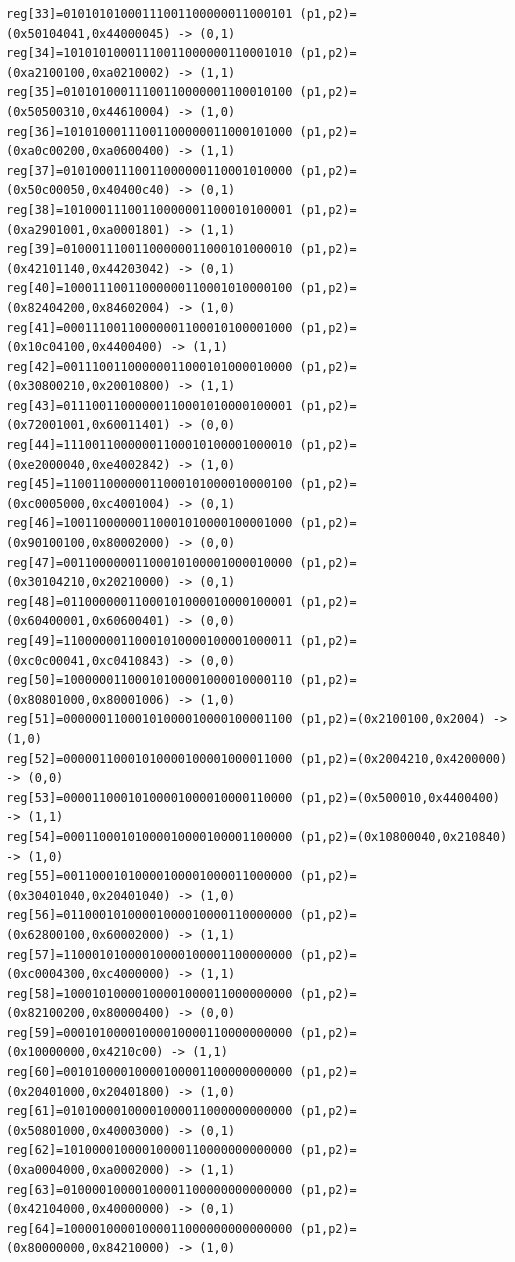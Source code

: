 \begin{lstlisting}
reg[33]=01010101000111001100000011000101 (p1,p2)=(0x50104041,0x44000045) -> (0,1)
reg[34]=10101010001110011000000110001010 (p1,p2)=(0xa2100100,0xa0210002) -> (1,1)
reg[35]=01010100011100110000001100010100 (p1,p2)=(0x50500310,0x44610004) -> (1,0)
reg[36]=10101000111001100000011000101000 (p1,p2)=(0xa0c00200,0xa0600400) -> (1,1)
reg[37]=01010001110011000000110001010000 (p1,p2)=(0x50c00050,0x40400c40) -> (0,1)
reg[38]=10100011100110000001100010100001 (p1,p2)=(0xa2901001,0xa0001801) -> (1,1)
reg[39]=01000111001100000011000101000010 (p1,p2)=(0x42101140,0x44203042) -> (0,1)
reg[40]=10001110011000000110001010000100 (p1,p2)=(0x82404200,0x84602004) -> (1,0)
reg[41]=00011100110000001100010100001000 (p1,p2)=(0x10c04100,0x4400400) -> (1,1)
reg[42]=00111001100000011000101000010000 (p1,p2)=(0x30800210,0x20010800) -> (1,1)
reg[43]=01110011000000110001010000100001 (p1,p2)=(0x72001001,0x60011401) -> (0,0)
reg[44]=11100110000001100010100001000010 (p1,p2)=(0xe2000040,0xe4002842) -> (1,0)
reg[45]=11001100000011000101000010000100 (p1,p2)=(0xc0005000,0xc4001004) -> (0,1)
reg[46]=10011000000110001010000100001000 (p1,p2)=(0x90100100,0x80002000) -> (0,0)
reg[47]=00110000001100010100001000010000 (p1,p2)=(0x30104210,0x20210000) -> (0,1)
reg[48]=01100000011000101000010000100001 (p1,p2)=(0x60400001,0x60600401) -> (0,0)
reg[49]=11000000110001010000100001000011 (p1,p2)=(0xc0c00041,0xc0410843) -> (0,0)
reg[50]=10000001100010100001000010000110 (p1,p2)=(0x80801000,0x80001006) -> (1,0)
reg[51]=00000011000101000010000100001100 (p1,p2)=(0x2100100,0x2004) -> (1,0)
reg[52]=00000110001010000100001000011000 (p1,p2)=(0x2004210,0x4200000) -> (0,0)
reg[53]=00001100010100001000010000110000 (p1,p2)=(0x500010,0x4400400) -> (1,1)
reg[54]=00011000101000010000100001100000 (p1,p2)=(0x10800040,0x210840) -> (1,0)
reg[55]=00110001010000100001000011000000 (p1,p2)=(0x30401040,0x20401040) -> (1,0)
reg[56]=01100010100001000010000110000000 (p1,p2)=(0x62800100,0x60002000) -> (1,1)
reg[57]=11000101000010000100001100000000 (p1,p2)=(0xc0004300,0xc4000000) -> (1,1)
reg[58]=10001010000100001000011000000000 (p1,p2)=(0x82100200,0x80000400) -> (0,0)
reg[59]=00010100001000010000110000000000 (p1,p2)=(0x10000000,0x4210c00) -> (1,1)
reg[60]=00101000010000100001100000000000 (p1,p2)=(0x20401000,0x20401800) -> (1,0)
reg[61]=01010000100001000011000000000000 (p1,p2)=(0x50801000,0x40003000) -> (0,1)
reg[62]=10100001000010000110000000000000 (p1,p2)=(0xa0004000,0xa0002000) -> (1,1)
reg[63]=01000010000100001100000000000000 (p1,p2)=(0x42104000,0x40000000) -> (0,1)
reg[64]=10000100001000011000000000000000 (p1,p2)=(0x80000000,0x84210000) -> (1,0)

\end{lstlisting}
